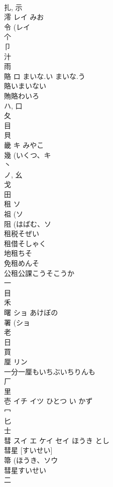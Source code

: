 \documentclass[8pt]{extreport}
\begin{document}
\begin{CJK}{UTF8}{min}
\\	扎, 示 
\\	澪	レイ	みお	
\\	令 (レイ 
\\	个 
\\	卩 
\\	汁 
\\	雨 
\\	賂	ロ	まいな.い まいな.う	
\\	賂いまいない 
\\	賄賂わいろ 
\\	ハ, 口 
\\	夂 
\\	目 
\\	貝 
\\	畿	キ	みやこ	
\\	幾 (いくつ、キ 
\\	丶 
\\	ノ, 幺 
\\	戈 
\\	田 
\\	租	ソ		
\\	祖 (ソ 
\\	阻 (はばむ、ソ 
\\	租税そぜい 
\\	租借そしゃく 
\\	地租ちそ 
\\	免租めんそ 
\\	公租公課こうそこうか 
\\	一 
\\	目 
\\	禾 
\\	曙	ショ	あけぼの	
\\	署 (ショ 
\\	老 
\\	日 
\\	買 
\\	厘	リン		
\\	一分一厘もいちぶいちりんも
\\	厂 
\\	里 
\\	壱	イチ イツ	ひとつ い かず	
\\	冖 
\\	匕 
\\	士 
\\	彗	スイ エ ケイ セイ	ほうき とし	
\\	彗星 [すいせい] 
\\	箒 (ほうき、ソウ 
\\	彗星すいせい
\\	二 

\end{CJK}
\end{document}
